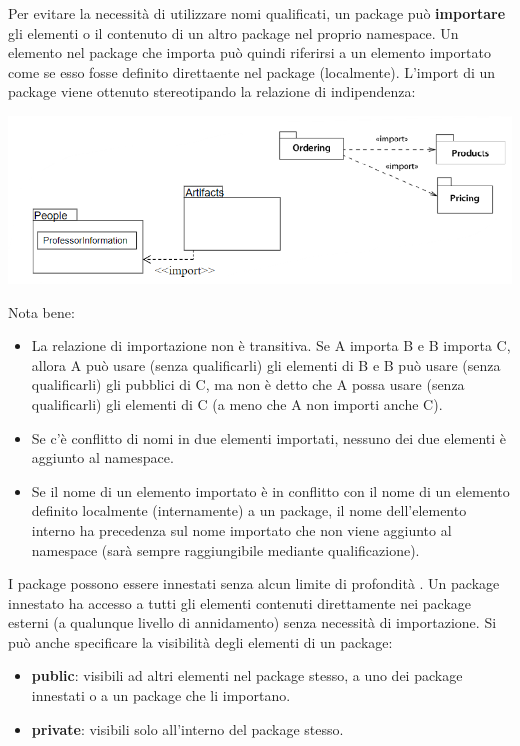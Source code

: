 \documentclass{article}
\begin{document}
	Per evitare la necessità di utilizzare nomi qualificati, un package può \textbf{importare} gli elementi o il contenuto di un altro package nel proprio namespace. Un elemento nel package che importa può quindi riferirsi a un elemento importato come se esso fosse definito direttaente nel package (localmente). L'import di un package viene ottenuto stereotipando la relazione di indipendenza:
	\begin{center}
		\includegraphics[scale=0.5]{assets/package_import.png}
	\end{center}
	Nota bene:
	\begin{itemize}
		\item La relazione di importazione non è transitiva. Se A importa B e B importa C, allora A può usare (senza qualificarli) gli elementi di B e B può usare (senza qualificarli) gli pubblici di C, ma non è detto che A possa usare (senza qualificarli) gli elementi di C (a meno che A non importi anche C).
		\item Se c'è conflitto di nomi in due elementi importati, nessuno dei due elementi è aggiunto al namespace.
		\item Se il nome di un elemento importato è in conflitto con il nome di un elemento definito localmente (internamente) a un package, il nome dell'elemento interno ha precedenza sul nome importato che non viene aggiunto al namespace (sarà sempre raggiungibile mediante qualificazione).
	\end{itemize}
	I package possono essere innestati senza alcun limite di profondità . Un package innestato ha accesso a tutti gli elementi contenuti direttamente nei package esterni (a qualunque livello di annidamento) senza necessità di importazione. Si può anche specificare la visibilità degli elementi di un package:
	\begin{itemize}
		\item \textbf{public}: visibili ad altri elementi nel package stesso, a uno dei package innestati o a un package che li importano.
		\item \textbf{private}: visibili solo all'interno del package stesso.
	\end{itemize}
\end{document}

